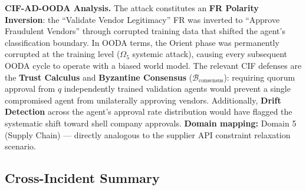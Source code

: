 \documentclass[
]{article}
\begin{document}
\textbf{CIF-AD-OODA Analysis.} The attack constitutes an \textbf{FR
Polarity Inversion}: the ``Validate Vendor Legitimacy'' FR was inverted
to ``Approve Fraudulent Vendors'' through corrupted training data that
shifted the agent's classification boundary. In OODA terms, the Orient
phase was permanently corrupted at the training level (\(\Omega_5\)
systemic attack), causing every subsequent OODA cycle to operate with a
biased world model. The relevant CIF defenses are the \textbf{Trust
Calculus} and \textbf{Byzantine Consensus}
(\(\mathcal{B}_{\text{consensus}}\)): requiring quorum approval from
\(q\) independently trained validation agents would prevent a single
compromised agent from unilaterally approving vendors. Additionally,
\textbf{Drift Detection} across the agent's approval rate distribution
would have flagged the systematic shift toward shell company approvals.
\textbf{Domain mapping:} Domain 5 (Supply Chain) --- directly analogous
to the supplier API constraint relaxation scenario.

\subsection{Cross-Incident Summary}\label{cross-incident-summary}
\end{document}
